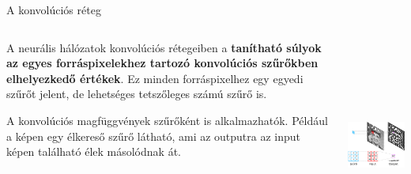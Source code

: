 \documentclass[english, aspectratio=169]{beamer}
\begin{document}
\begin{frame}{A konvolúciós réteg}
\begin{columns}
\begin{column}{.5\textwidth}
A neurális hálózatok konvolúciós rétegeiben a \textbf{tanítható súlyok az egyes forráspixelekhez tartozó konvolúciós szűrőkben elhelyezkedő értékek}. Ez minden forráspixelhez egy egyedi szűrőt jelent, de lehetséges tetszőleges számú szűrő is.\par\smallskip
A konvolúciós magfüggvények szűrőként is alkalmazhatók. Például a képen egy élkereső szűrő látható, ami az outputra az input képen található élek másolódnak át.\par\smallskip  
\end{column}
\begin{column}{.5\textwidth}
\begin{center}
\includegraphics[height=7cm, width=7cm, keepaspectratio]{images/dl_4.png}
\end{center}
\end{column}
\end{columns}
\end{frame}
\end{document}
